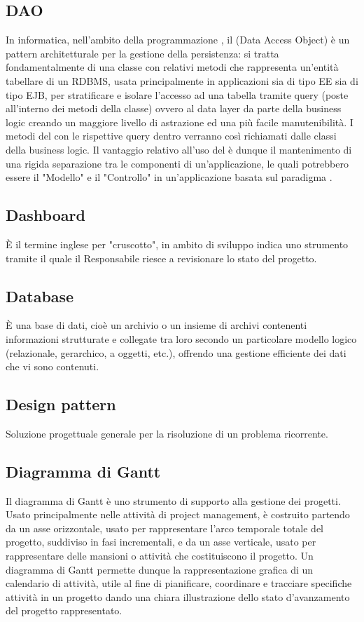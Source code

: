 \subsection{DAO}
In informatica, nell'ambito della programmazione , il  (Data Access Object) è un pattern architetturale per la gestione della persistenza: si tratta fondamentalmente di una classe con relativi metodi che rappresenta un'entità tabellare di un RDBMS, usata principalmente in applicazioni  sia di tipo  EE sia di tipo EJB, per stratificare e isolare l'accesso ad una tabella tramite query (poste all'interno dei metodi della classe) ovvero al data layer da parte della business logic creando un maggiore livello di astrazione ed una più facile manutenibilità. I metodi del  con le rispettive query dentro verranno così richiamati dalle classi della business logic. Il vantaggio relativo all'uso del  è dunque il mantenimento di una rigida separazione tra le componenti di un'applicazione, le quali potrebbero essere il "Modello" e il "Controllo" in un'applicazione basata sul paradigma .

\subsection{Dashboard}
È il termine inglese per "cruscotto", in ambito di sviluppo indica uno strumento
tramite il quale il Responsabile riesce a revisionare lo stato del progetto.

\subsection{Database}
È una base di dati, cioè un archivio o un insieme di archivi contenenti informazioni
strutturate e collegate tra loro secondo un particolare modello logico (relazionale, gerarchico,
a oggetti, etc.), offrendo una gestione efficiente dei dati che vi sono contenuti.

\subsection{Design pattern}
Soluzione progettuale generale per la risoluzione di un problema ricorrente.

\subsection{Diagramma di Gantt}
Il diagramma di Gantt è uno strumento di supporto alla gestione dei
progetti. Usato principalmente nelle attività di project management, è costruito partendo da
un asse orizzontale, usato per rappresentare l’arco temporale totale del progetto, suddiviso
in fasi incrementali, e da un asse verticale, usato per rappresentare delle mansioni o attività
che costituiscono il progetto. Un diagramma di Gantt permette dunque la rappresentazione
grafica di un calendario di attività, utile al fine di pianificare, coordinare e tracciare specifiche
attività in un progetto dando una chiara illustrazione dello stato d’avanzamento del progetto
rappresentato.

